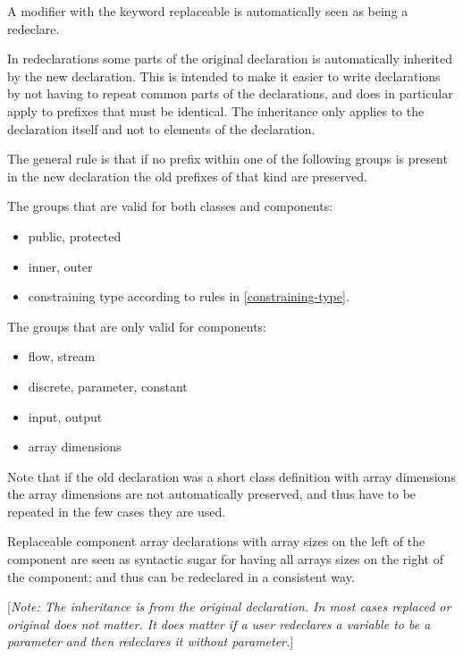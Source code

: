\documentclass[10pt,a4paper]{report}
\begin{document}
A modifier with the keyword replaceable is automatically seen as being a
redeclare.

In redeclarations some parts of the original declaration is
automatically inherited by the new declaration. This is intended to make
it easier to write declarations by not having to repeat common parts of
the declarations, and does in particular apply to prefixes that must be
identical. The inheritance only applies to the declaration itself and
not to elements of the declaration.

The general rule is that if no prefix within one of the following groups
is present in the new declaration the old prefixes of that kind are
preserved.

The groups that are valid for both classes and components:

\begin{itemize}
\item
  public, protected
\item
  inner, outer
\item
  constraining type according to rules in \ref{constraining-type}.
\end{itemize}

The groups that are only valid for components:

\begin{itemize}
\item
  flow, stream
\end{itemize}

\begin{itemize}
\item
  discrete, parameter, constant
\item
  input, output
\item
  array dimensions
\end{itemize}

Note that if the old declaration was a short class definition with array
dimensions the array dimensions are not automatically preserved, and
thus have to be repeated in the few cases they are used.

Replaceable component array declarations with array sizes on the left of
the component are seen as syntactic sugar for having all arrays sizes on
the right of the component; and thus can be redeclared in a consistent
way.

{[}\emph{Note: The inheritance is from the original declaration. In most
cases replaced or original does not matter. It does matter if a user
redeclares a variable to be a parameter and then redeclares it without
parameter.}{]}
\end{document}
